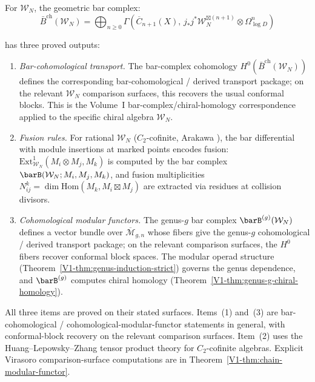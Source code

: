 \begin{theorem}
\label{thm:w-algebra-bar-complex}
For $\mathcal{W}_N$, the geometric bar complex:
\[\bar{B}^{\text{ch}}(\mathcal{W}_N) =
\bigoplus_{n \geq 0} \Gamma\!\left(\overline{C}_{n+1}(X),\,
 j_*j^*\mathcal{W}_N^{\boxtimes(n+1)} \otimes \Omega^n_{\log D}\right)\]

has three proved outputs:
\begin{enumerate}
\item \emph{Bar-cohomological transport.}
The bar-complex cohomology
$H^0(\bar{B}^{\mathrm{ch}}(\mathcal{W}_N))$ defines the
corresponding bar-cohomological / derived transport package; on the
relevant $\mathcal{W}_N$ comparison surfaces, this recovers the
usual conformal blocks. This is the Volume~I
bar-complex/chiral-homology correspondence applied to the specific
chiral algebra $\mathcal{W}_N$.

\item \emph{Fusion rules.} For rational $\mathcal{W}_N$
\textup{(}$C_2$-cofinite, Arakawa \cite{Ara07}\textup{)},
the bar differential with module insertions at marked
points encodes fusion: $\mathrm{Ext}^1_{\mathcal{W}_N}(M_i
\otimes M_j, M_k)$ is computed by the bar complex
$\barB(\mathcal{W}_N; M_i, M_j, M_k)$, and fusion
multiplicities $N_{ij}^k = \dim
\mathrm{Hom}(M_k, M_i \boxtimes M_j)$ are extracted via
residues at collision divisors.

\item \emph{Cohomological modular functors.} The genus-$g$ bar complex
$\barB^{(g)}(\mathcal{W}_N)$ defines a vector bundle
over $\overline{\mathcal{M}}_{g,n}$ whose fibers give the
genus-$g$ cohomological / derived transport package; on the
relevant comparison surfaces, the $H^0$ fibers recover conformal
block spaces. The modular operad structure
\textup{(}Theorem~\textup{\ref*{V1-thm:genus-induction-strict})}
governs the genus dependence, and
$\barB^{(g)}$ computes chiral homology
\textup{(}Theorem~\textup{\ref*{V1-thm:genus-g-chiral-homology})}.
\end{enumerate}
\end{theorem}

\begin{remark}
All three items are proved on their stated surfaces. Items~(1)
and~(3) are bar-cohomological / cohomological-modular-functor
statements in general, with conformal-block recovery on the
relevant comparison surfaces. Item~(2) uses the
Huang--Lepowsky--Zhang tensor product theory \cite{HLZ} for
$C_2$-cofinite algebras. Explicit Virasoro comparison-surface
computations are in Theorem~\ref*{V1-thm:chain-modular-functor}.
\end{remark}


